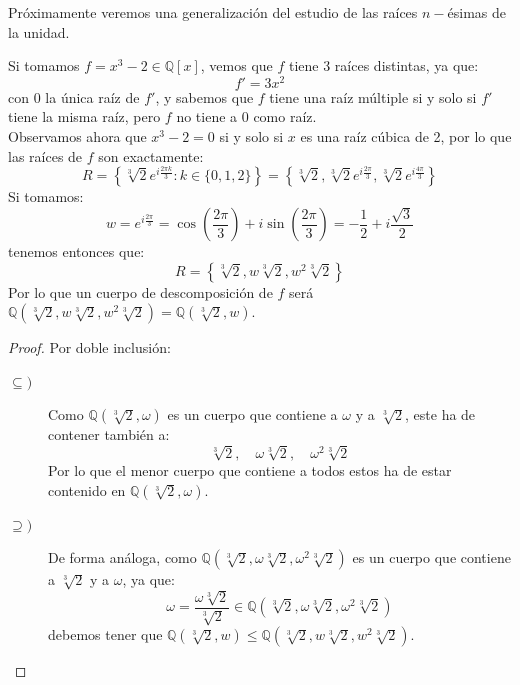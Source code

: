 \noindent
Próximamente veremos una generalización del estudio de las raíces $n-$ésimas de la unidad.

\begin{ejemplo}
    Si tomamos $f=x^3-2\in \mathbb{Q}[x]$, vemos que $f$ tiene 3 raíces distintas, ya que:
    \begin{equation*}
        f' = 3x^2
    \end{equation*}
    con $0$ la única raíz de $f'$, y sabemos que $f$ tiene una raíz múltiple si y solo si $f'$ tiene la misma raíz, pero $f$ no tiene a $0$ como raíz.\\

    \noindent
    Observamos ahora que $x^3-2 = 0$ si y solo si $x$ es una raíz cúbica de 2, por lo que las raíces de $f$ son exactamente:
    \begin{equation*}
        R = \left\{\sqrt[3]{2}e^{i\frac{2\pi k}{3}} : k \in \{0,1,2\}\right\} = \left\{\sqrt[3]{2}, \sqrt[3]{2}e^{i\frac{2\pi}{3}}, \sqrt[3]{2}e^{i\frac{4\pi}{3}}\right\}
    \end{equation*}
    Si tomamos:
    \begin{equation*}
        w = e^{i\frac{2\pi}{3}} = \cos\left(\frac{2\pi}{3}\right) + i \sin\left(\frac{2\pi}{3}\right)  = -\frac{1}{2} + i\frac{\sqrt{3}}{2}
    \end{equation*}
    tenemos entonces que:
    \begin{equation*}
        R = \left\{\sqrt[3]{2},w\sqrt[3]{2},w^2\sqrt[3]{2}\right\}
    \end{equation*}
    Por lo que un cuerpo de descomposición de $f$ será $\mathbb{Q}\left(\sqrt[3]{2},w\sqrt[3]{2},w^2\sqrt[3]{2}\right) = \mathbb{Q}\left(\sqrt[3]{2},w\right)$.
    \begin{proof}
        Por doble inclusión:
        \begin{description}
            \item [$\subseteq )$] Como $\mathbb{Q}\left(\sqrt[3]{2}, \omega\right)$ es un cuerpo que contiene a $\omega$ y a $\sqrt[3]{2}$, este ha de contener también a:
                \begin{equation*}
                    \sqrt[3]{2}, \quad \omega\sqrt[3]{2}, \quad \omega^2 \sqrt[3]{2}
                \end{equation*}
                Por lo que el menor cuerpo que contiene a todos estos ha de estar contenido en $\mathbb{Q}\left(\sqrt[3]{2}, \omega\right)$.
            \item [$\supseteq )$] De forma análoga, como $\mathbb{Q}\left(\sqrt[3]{2}, \omega\sqrt[3]{2}, \omega^2\sqrt[3]{2}\right)$ es un cuerpo que contiene a $\sqrt[3]{2}$ y a $\omega$, ya que:
                \begin{equation*}
                    \omega = \dfrac{\omega \sqrt[3]{2}}{\sqrt[3]{2}} \in \mathbb{Q}\left(\sqrt[3]{2}, \omega\sqrt[3]{2}, \omega^2\sqrt[3]{2}\right)
                \end{equation*}
                debemos tener que $\mathbb{Q}(\sqrt[3]{2},w)\leq \mathbb{Q}\left(\sqrt[3]{2},w\sqrt[3]{2},w^2\sqrt[3]{2}\right)$.
        \end{description}
    \end{proof}
\end{ejemplo}

